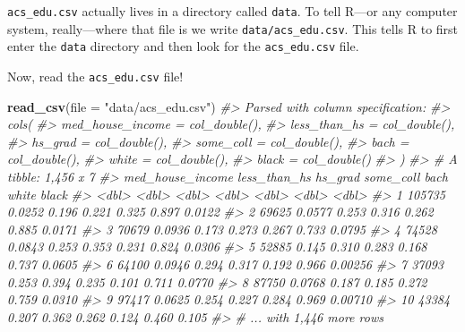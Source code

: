 \documentclass[
]{book}
\newenvironment{Shaded}{\begin{snugshade}}{\end{snugshade}}
\newcommand{\CommentTok}[1]{\textcolor[rgb]{0.56,0.35,0.01}{\textit{#1}}}
\newcommand{\DataTypeTok}[1]{\textcolor[rgb]{0.13,0.29,0.53}{#1}}
\newcommand{\KeywordTok}[1]{\textcolor[rgb]{0.13,0.29,0.53}{\textbf{#1}}}
\newcommand{\NormalTok}[1]{#1}
\newcommand{\StringTok}[1]{\textcolor[rgb]{0.31,0.60,0.02}{#1}}
\begin{document}
\texttt{acs\_edu.csv} actually lives in a directory called \texttt{data}. To tell R---or any computer system, really---where that file is we write \texttt{data/acs\_edu.csv}. This tells R to first enter the \texttt{data} directory and then look for the \texttt{acs\_edu.csv} file.

Now, read the \texttt{acs\_edu.csv} file!

\begin{Shaded}
\begin{Highlighting}[]
\KeywordTok{read\_csv}\NormalTok{(}\DataTypeTok{file =} \StringTok{"data/acs\_edu.csv"}\NormalTok{) }
\CommentTok{\#\textgreater{} Parsed with column specification:}
\CommentTok{\#\textgreater{} cols(}
\CommentTok{\#\textgreater{}   med\_house\_income = col\_double(),}
\CommentTok{\#\textgreater{}   less\_than\_hs = col\_double(),}
\CommentTok{\#\textgreater{}   hs\_grad = col\_double(),}
\CommentTok{\#\textgreater{}   some\_coll = col\_double(),}
\CommentTok{\#\textgreater{}   bach = col\_double(),}
\CommentTok{\#\textgreater{}   white = col\_double(),}
\CommentTok{\#\textgreater{}   black = col\_double()}
\CommentTok{\#\textgreater{} )}
\CommentTok{\#\textgreater{} \# A tibble: 1,456 x 7}
\CommentTok{\#\textgreater{}    med\_house\_income less\_than\_hs hs\_grad some\_coll  bach white   black}
\CommentTok{\#\textgreater{}               \textless{}dbl\textgreater{}        \textless{}dbl\textgreater{}   \textless{}dbl\textgreater{}     \textless{}dbl\textgreater{} \textless{}dbl\textgreater{} \textless{}dbl\textgreater{}   \textless{}dbl\textgreater{}}
\CommentTok{\#\textgreater{}  1           105735       0.0252   0.196     0.221 0.325 0.897 0.0122 }
\CommentTok{\#\textgreater{}  2            69625       0.0577   0.253     0.316 0.262 0.885 0.0171 }
\CommentTok{\#\textgreater{}  3            70679       0.0936   0.173     0.273 0.267 0.733 0.0795 }
\CommentTok{\#\textgreater{}  4            74528       0.0843   0.253     0.353 0.231 0.824 0.0306 }
\CommentTok{\#\textgreater{}  5            52885       0.145    0.310     0.283 0.168 0.737 0.0605 }
\CommentTok{\#\textgreater{}  6            64100       0.0946   0.294     0.317 0.192 0.966 0.00256}
\CommentTok{\#\textgreater{}  7            37093       0.253    0.394     0.235 0.101 0.711 0.0770 }
\CommentTok{\#\textgreater{}  8            87750       0.0768   0.187     0.185 0.272 0.759 0.0310 }
\CommentTok{\#\textgreater{}  9            97417       0.0625   0.254     0.227 0.284 0.969 0.00710}
\CommentTok{\#\textgreater{} 10            43384       0.207    0.362     0.262 0.124 0.460 0.105  }
\CommentTok{\#\textgreater{} \# ... with 1,446 more rows}
\end{Highlighting}
\end{Shaded}
\end{document}
